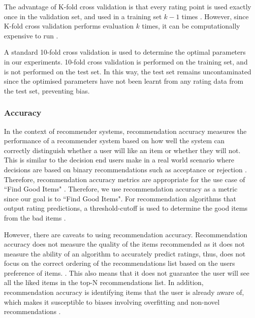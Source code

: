 The advantage of K-fold cross validation is that every rating point is used exactly once in the validation set, and used in a training set $k-1$ times \cite{kfold}. However, since K-fold cross validation performs evaluation $k$ times, it can be computationally expensive to run \cite{kfold}.

A standard 10-fold cross validation is used to determine the optimal parameters in our experiments. 10-fold cross validation is performed on the training set, and is not performed on the test set. In this way, the test set remains uncontaminated since the optimised parameters have not been learnt from any rating data from the test set, preventing bias.

\subsubsection{}

\subsubsection{ Accuracy} \label{accuracy}

In the context of recommender systems, recommendation accuracy measures the performance of a recommender system based on how well the system can correctly distinguish whether a user will like an item or whether they will not. This is similar to the decision end users make in a real world scenario where decisions are based on binary recommendations such as acceptance or rejection \cite{zhang}. Therefore, recommendation accuracy metrics are appropriate for the use case of ``Find Good Items" \cite{evaluation}. Therefore, we use recommendation accuracy as a metric since our goal is to ``Find Good Items". For recommendation algorithms that output rating predictions, a threshold-cutoff is used to determine the good items from the bad items \cite{zhang}.

However, there are caveats to using recommendation accuracy. Recommendation accuracy does not measure the quality of the items recommended as it does not measure the ability of an algorithm to accurately predict ratings, thus, does not focus on the correct ordering of the recommendations list based on the users preference of items. . This also means that it does not guarantee the user will see all the liked items in the top-N recommendations list. In addition, recommendation accuracy is identifying items that the user is already aware of, which makes it susceptible to biases involving overfitting and non-novel recommendations \cite{evaluation}. 

